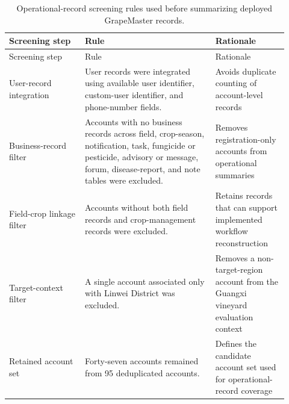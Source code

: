 \documentclass[12pt]{article}
\begin{document}
\begingroup
\setlength{\tabcolsep}{3pt}
\renewcommand{\arraystretch}{1.12}
\begin{longtable}{@{}L{0.25\linewidth} L{0.43\linewidth} L{0.24\linewidth}@{}}
\caption{Operational-record screening rules used before summarizing deployed GrapeMaster records.}\label{tab:supp_screening_rules}\\
\toprule
Screening step & Rule & Rationale \\
\midrule
\endfirsthead
\toprule
Screening step & Rule & Rationale \\
\midrule
\endhead
User-record integration & User records were integrated using available user identifier, custom-user identifier, and phone-number fields. & Avoids duplicate counting of account-level records \\
Business-record filter & Accounts with no business records across field, crop-season, notification, task, fungicide or pesticide, advisory or message, forum, disease-report, and note tables were excluded. & Removes registration-only accounts from operational summaries \\
Field-crop linkage filter & Accounts without both field records and crop-management records were excluded. & Retains records that can support implemented workflow reconstruction \\
Target-context filter & A single account associated only with Linwei District was excluded. & Removes a non-target-region account from the Guangxi vineyard evaluation context \\
Retained account set & Forty-seven accounts remained from 95 deduplicated accounts. & Defines the candidate account set used for operational-record coverage \\
\bottomrule
\end{longtable}
\endgroup
\end{document}

